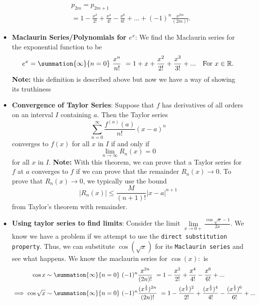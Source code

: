 \documentclass{report}
\begin{document}
\begin{itemize}
\begin{align*}
                    &p_{2m} = p_{2m+1} \\
                    &=1 - \frac{x^{2}}{2!} + \frac{x^{4}}{4!} -\frac{x^{6}}{6!}     + ... + (-1)^{n}\frac{x^{2m}}{(2m)!}
                .\end{align*}
            \item \textbf{Maclaurin Series/Polynomials for $e^{x}$}: We find the Maclaurin series for the exponential function to be 
                \begin{align*}
                    e^{x} = \summation{\infty}{n=0}\ \frac{x^{n}}{n!}\  = 1 + x + \frac{x^{2}}{2!} + \frac{x^{3}}{3!} + ... \quad \text{For } x\in\mathbb{R}
                .\end{align*}
                \bigbreak \noindent 
                \textbf{Note:} this definition is described above but now we have a way of showing its truthiness
            \item \textbf{Convergence of Taylor Series}:
                Suppose that $f$ has derivatives of all orders on an interval $I$ containing $a$. Then the Taylor series
                \[
                    \sum_{n=0}^{\infty} \frac{f^{(n)}(a)}{n!}(x-a)^n
                \]
                converges to $f(x)$ for all $x$ in $I$ if and only if
                \[
                    \lim_{n \to \infty} R_n(x) = 0
                \]
                for all $x$ in $I$.
                \bigbreak \noindent 
                \textbf{Note:}  With this theorem, we can prove that a Taylor series for $f$ at $a$ converges to $f$ if we can prove that the remainder $R_n(x) \to 0$. To prove that $R_n(x) \to 0$, we typically use the bound
                \[
                    |R_n(x)| \leq \frac{M}{(n+1)!}|x - a|^{n+1}
                \]
                from Taylor’s theorem with remainder.
            \item \textbf{Using taylor series to find limits}: Consider the limit $\lim\limits_{x \to 0+}{\frac{\cos{\sqrt{x}} -1}{2x}}$. We know we have a problem if we attempt to use the \texttt{direct substitution property}. Thus, we can substitute $\cos{(\sqrt{x})}$ for its \texttt{Maclaurin series} and see what happens. We know the maclaurin series for $\cos{(x)}:$ is 
                \begin{align*}
                    \cos{x} &\sim \summation{\infty}{n=0}\ (-1)^{n}\frac{x^{2n}}{(2n)!}\   = 1 - \frac{x^{2}}{2!} + \frac{x^{4}}{4!} - \frac{x^{6}}{6!} + ... \\
                    \implies \cos{\sqrt{x}} &\sim \summation{\infty}{n=0}\ (-1)^{n}\frac{(x^{\frac{1}{2}})^{2n}}{(2n)!}\   = 1 - \frac{(x^{\frac{1}{2}})^{2}}{2!} + \frac{(x^{\frac{1}{2}})^{4}}{4!} - \frac{(x^{\frac{1}{2}})^{6}}{6!} + ... \\

\end{align*}
\end{itemize}
\end{document}
